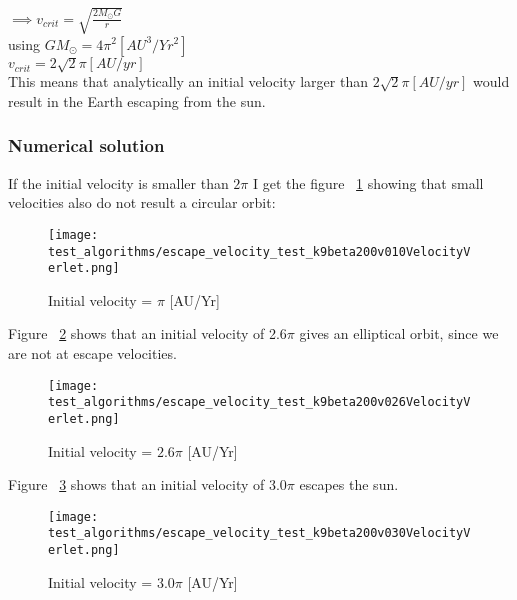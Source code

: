 $\implies v_{crit}=\sqrt{\frac{2M_{\odot}G}{r}}$\\

using $GM_{\odot} = 4\pi^2 [AU^3/Yr^2]$\\

$v_{crit} = 2\sqrt{2}\pi [AU/yr]$\\

This means that analytically an initial velocity larger than $2\sqrt{2}\pi [AU/yr]$ would result in the Earth escaping from the sun.\\

\subsubsection{Numerical solution}
If the initial velocity is smaller than $2\pi$ I get the figure ~\ref{fig:Earth_sun_jupiter_v0_pi} showing that small velocities also do not result a circular orbit:

\FloatBarrier
\begin{figure}[!ht]
\centering
\FloatBarrier
\texttt{[image: test\_algorithms/escape\_velocity\_test\_k9beta200v010VelocityVerlet.png]}

\caption{Initial velocity = $\pi$ [AU/Yr]}
\label{fig:Earth_sun_jupiter_v0_pi}
\end{figure}
\FloatBarrier

Figure ~\ref{fig:Earth_sun_jupiter_v0_2.6_pi} shows that an initial velocity of 2.6$\pi$ gives an elliptical orbit, since we are not at escape velocities.

\FloatBarrier
\begin{figure}[!ht]
\centering
\FloatBarrier
\texttt{[image: test\_algorithms/escape\_velocity\_test\_k9beta200v026VelocityVerlet.png]}

\caption{Initial velocity = $2.6\pi$ [AU/Yr]}
\label{fig:Earth_sun_jupiter_v0_2.6_pi}
\end{figure}
\FloatBarrier

Figure ~\ref{fig:Earth_sun_jupiter_v0_3.0_pi} shows that an initial velocity of 3.0$\pi$ escapes the sun.

\FloatBarrier
\begin{figure}[!ht]
\centering
\FloatBarrier
\texttt{[image: test\_algorithms/escape\_velocity\_test\_k9beta200v030VelocityVerlet.png]}

\caption{Initial velocity = $3.0\pi$ [AU/Yr]}
\label{fig:Earth_sun_jupiter_v0_3.0_pi}
\end{figure}
\FloatBarrier

